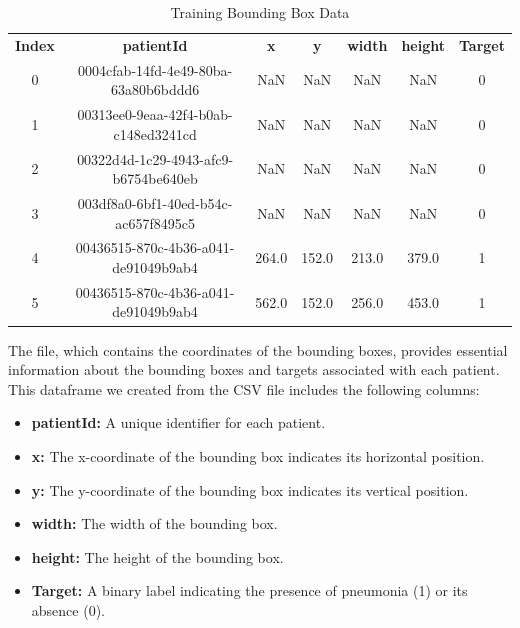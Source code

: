 \begin{table}[h!]
    \centering
    \caption{Training Bounding Box Data}
    \label{tab:cha-2 table1}
    \begin{tabular}{c|c|c|c|c|c|c}
        \rowcolor{gray!20}
        \textbf{Index} & \textbf{patientId}                   & \textbf{x} & \textbf{y} & \textbf{width} & \textbf{height} & \textbf{Target} \\
        0              & 0004cfab-14fd-4e49-80ba-63a80b6bddd6 & NaN        & NaN        & NaN            & NaN             & 0               \\
        1              & 00313ee0-9eaa-42f4-b0ab-c148ed3241cd & NaN        & NaN        & NaN            & NaN             & 0               \\
        2              & 00322d4d-1c29-4943-afc9-b6754be640eb & NaN        & NaN        & NaN            & NaN             & 0               \\
        3              & 003df8a0-6bf1-40ed-b54c-ac657f8495c5 & NaN        & NaN        & NaN            & NaN             & 0               \\
        4              & 00436515-870c-4b36-a041-de91049b9ab4 & 264.0      & 152.0      & 213.0          & 379.0           & 1               \\
        5              & 00436515-870c-4b36-a041-de91049b9ab4 & 562.0      & 152.0      & 256.0          & 453.0           & 1               \\
    \end{tabular}
\end{table}

The file, which contains the coordinates of the bounding boxes, provides essential information about the bounding boxes and targets associated with each patient. This dataframe we created from the CSV file includes the following columns:

\begin{itemize}
    \item \textbf{patientId:} A unique identifier for each patient.
    \item \textbf{x:} The x-coordinate of the bounding box indicates its horizontal position.
    \item \textbf{y:} The y-coordinate of the bounding box indicates its vertical position.
    \item \textbf{width:} The width of the bounding box.
    \item \textbf{height:} The height of the bounding box.
    \item \textbf{Target:} A binary label indicating the presence of pneumonia (1) or its absence (0).
\end{itemize}

